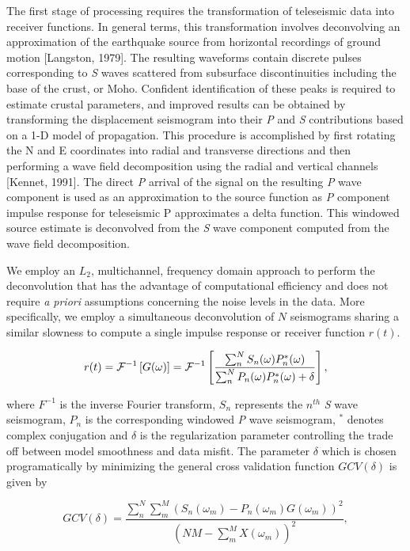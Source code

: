\documentclass[draft, 12pt]{article}
\begin{document}
The first stage of processing requires the transformation of teleseismic data into receiver functions. In general terms, this transformation involves deconvolving an approximation of the earthquake source from horizontal recordings of ground motion [Langston, 1979]. The resulting waveforms contain discrete pulses corresponding to {\it S} waves scattered from subsurface discontinuities including the base of the crust, or Moho. Confident identification of these peaks is required to estimate crustal parameters, and improved results can be obtained by transforming the displacement seismogram into their {\it P} and {\it S} contributions based on a 1-D model of propagation. This procedure is accomplished by first rotating the N and E coordinates into radial and transverse directions and then performing a wave field decomposition using the radial and vertical channels [Kennet, 1991]. The direct {\it P} arrival of the signal on the resulting {\it P} wave component is used as an approximation to the source function as {\it P} component impulse response for teleseismic P approximates a delta function. This windowed source estimate is deconvolved from the {\it S} wave component computed from the wave field decomposition.

We employ an $L_2$, multichannel, frequency domain approach to perform the deconvolution that has the advantage of computational efficiency and does not require {\it a priori} assumptions concerning the noise levels in the data. More specifically, we employ a simultaneous deconvolution of $N$ seismograms sharing a similar slowness to compute a single impulse response or receiver function $r(t)$.

\begin{equation}
  r(t) = {\cal F}^{-1} \left[ G(\omega) \right] = {\cal F}^{-1}
 \left[ \frac {\sum_n^N S_n(\omega)P_n^*(\omega)} {\sum_n^N P_n(\omega)P_n^*(\omega) + \delta} \right ],
\end{equation}

\noindent where $F^{-1}$ is the inverse Fourier transform, $S_n$ represents the $n^{th}$ {\it S} wave seismogram, $P_n$ is the corresponding windowed {\it P} wave seismogram, $^*$ denotes complex conjugation and $\delta$ is the regularization parameter controlling the trade off between model smoothness and data misfit. The parameter $\delta$ which is chosen programatically by minimizing the general cross validation function $GCV(\delta)$ is given by

\begin{equation}
  GCV(\delta) = \frac {\sum_n^N\sum_m^M \left( S_n(\omega_m) - P_n(\omega_m)G(\omega_m) \right)^2 }
                      { \left( NM - \sum_m^M X(\omega_m) \right)^2 },
\end{equation}
\end{document}

